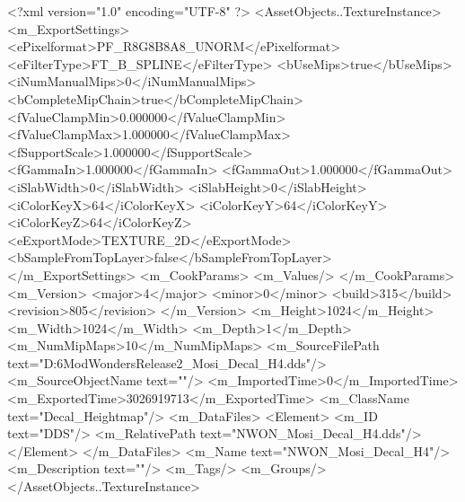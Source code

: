 <?xml version="1.0" encoding="UTF-8" ?>
<AssetObjects..TextureInstance>
	<m_ExportSettings>
		<ePixelformat>PF_R8G8B8A8_UNORM</ePixelformat>
		<eFilterType>FT_B_SPLINE</eFilterType>
		<bUseMips>true</bUseMips>
		<iNumManualMips>0</iNumManualMips>
		<bCompleteMipChain>true</bCompleteMipChain>
		<fValueClampMin>0.000000</fValueClampMin>
		<fValueClampMax>1.000000</fValueClampMax>
		<fSupportScale>1.000000</fSupportScale>
		<fGammaIn>1.000000</fGammaIn>
		<fGammaOut>1.000000</fGammaOut>
		<iSlabWidth>0</iSlabWidth>
		<iSlabHeight>0</iSlabHeight>
		<iColorKeyX>64</iColorKeyX>
		<iColorKeyY>64</iColorKeyY>
		<iColorKeyZ>64</iColorKeyZ>
		<eExportMode>TEXTURE_2D</eExportMode>
		<bSampleFromTopLayer>false</bSampleFromTopLayer>
	</m_ExportSettings>
	<m_CookParams>
		<m_Values/>
	</m_CookParams>
	<m_Version>
		<major>4</major>
		<minor>0</minor>
		<build>315</build>
		<revision>805</revision>
	</m_Version>
	<m_Height>1024</m_Height>
	<m_Width>1024</m_Width>
	<m_Depth>1</m_Depth>
	<m_NumMipMaps>10</m_NumMipMaps>
	<m_SourceFilePath text="D:\Civ6Mod\Terrain\NW\Natural Wonders\TM Release2\VictoriaFalls\MarshTextures\NWON_Mosi_Decal_H4.dds"/>
	<m_SourceObjectName text=""/>
	<m_ImportedTime>0</m_ImportedTime>
	<m_ExportedTime>3026919713</m_ExportedTime>
	<m_ClassName text="Decal_Heightmap"/>
	<m_DataFiles>
		<Element>
			<m_ID text="DDS"/>
			<m_RelativePath text="NWON_Mosi_Decal_H4.dds"/>
		</Element>
	</m_DataFiles>
	<m_Name text="NWON_Mosi_Decal_H4"/>
	<m_Description text=""/>
	<m_Tags/>
	<m_Groups/>
</AssetObjects..TextureInstance>

